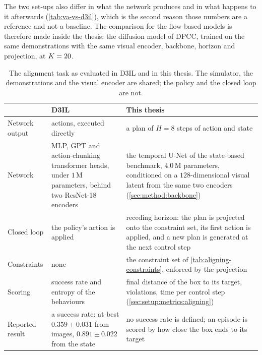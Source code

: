The two set-ups also differ in what the network produces and in what happens to it afterwards
(\autoref{tab:va-vs-d3il}), which is the second reason those numbers are a reference and not a baseline. The comparison for the flow-based models is therefore made inside the thesis:
the diffusion model of \ac{DPCC}, trained on the same demonstrations with the same visual encoder,
backbone, horizon and projection, at $K=20$.

\begin{table}[htpb]
  \caption[Alignment set-up against D3IL]{The alignment task as evaluated in D3IL and in this thesis.
  The simulator, the demonstrations and the visual encoder are shared; the policy and the closed loop are
  not.}
  \label{tab:va-vs-d3il}
  \centering
  \small
  \begin{tabularx}{\linewidth}{@{}p{2.6cm} L L@{}}
    \toprule
    & D3IL \parencite{jia2024towards} & This thesis \\
    \midrule
    Network output & actions, executed directly & a plan of $H=8$ steps of action and state \\
    \addlinespace[4pt]
    Network        & MLP, GPT and action-chunking transformer heads, under $1$\,M parameters, behind two ResNet-18 encoders & the temporal U-Net of the state-based benchmark, $4.0$\,M parameters, conditioned on a $128$-dimensional visual latent from the same two encoders (\autoref{sec:method:backbone}) \\
    \addlinespace[4pt]
    Closed loop    & the policy's action is applied & receding horizon: the plan is projected onto the constraint set, its first action is applied, and a new plan is generated at the next control step \\
    \addlinespace[4pt]
    Constraints    & none & the constraint set of \autoref{tab:aligning-constraints}, enforced by the projection \\
    \addlinespace[4pt]
    Scoring        & success rate and entropy of the behaviours & final distance of the box to its target, violations, time per control step (\autoref{sec:setup:metrics:aligning}) \\
    \addlinespace[4pt]
    Reported result & a success rate: at best $0.359 \pm 0.031$ from images, $0.891 \pm 0.022$ from the state & no success rate is defined; an episode is scored by how close the box ends to its target \\
    \bottomrule
  \end{tabularx}
\end{table}
\FloatBarrier
{}

